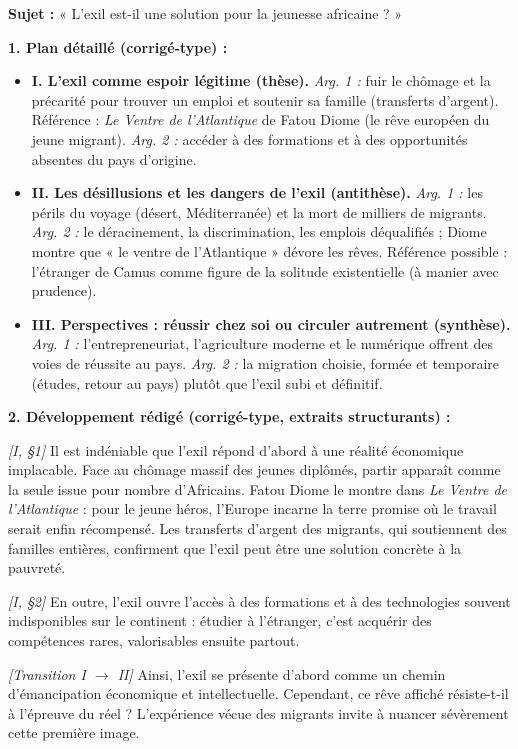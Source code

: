 \documentclass[11pt]{article}
\begin{document}
\begin{corrige}
\textbf{Sujet :} « L'exil est-il une solution pour la jeunesse africaine ? »

\textbf{1. Plan détaillé (corrigé-type) :}
\begin{itemize}
\item \textbf{I. L'exil comme espoir légitime (thèse).} \emph{Arg. 1 :} fuir le chômage et la précarité pour trouver un emploi et soutenir sa famille (transferts d'argent). Référence : \emph{Le Ventre de l'Atlantique} de Fatou Diome (le rêve européen du jeune migrant). \emph{Arg. 2 :} accéder à des formations et à des opportunités absentes du pays d'origine.
\item \textbf{II. Les désillusions et les dangers de l'exil (antithèse).} \emph{Arg. 1 :} les périls du voyage (désert, Méditerranée) et la mort de milliers de migrants. \emph{Arg. 2 :} le déracinement, la discrimination, les emplois déqualifiés ; Diome montre que « le ventre de l'Atlantique » dévore les rêves. Référence possible : l'étranger de Camus comme figure de la solitude existentielle (à manier avec prudence).
\item \textbf{III. Perspectives : réussir chez soi ou circuler autrement (synthèse).} \emph{Arg. 1 :} l'entrepreneuriat, l'agriculture moderne et le numérique offrent des voies de réussite au pays. \emph{Arg. 2 :} la migration choisie, formée et temporaire (études, retour au pays) plutôt que l'exil subi et définitif.
\end{itemize}

\textbf{2. Développement rédigé (corrigé-type, extraits structurants) :}

\emph{[I, §1]} Il est indéniable que l'exil répond d'abord à une réalité économique implacable. Face au chômage massif des jeunes diplômés, partir apparaît comme la seule issue pour nombre d'Africains. Fatou Diome le montre dans \emph{Le Ventre de l'Atlantique} : pour le jeune héros, l'Europe incarne la terre promise où le travail serait enfin récompensé. Les transferts d'argent des migrants, qui soutiennent des familles entières, confirment que l'exil peut être une solution concrète à la pauvreté.

\emph{[I, §2]} En outre, l'exil ouvre l'accès à des formations et à des technologies souvent indisponibles sur le continent : étudier à l'étranger, c'est acquérir des compétences rares, valorisables ensuite partout.

\emph{[Transition I $\to$ II]} Ainsi, l'exil se présente d'abord comme un chemin d'émancipation économique et intellectuelle. Cependant, ce rêve affiché résiste-t-il à l'épreuve du réel ? L'expérience vécue des migrants invite à nuancer sévèrement cette première image.


\end{corrige}
\end{document}

